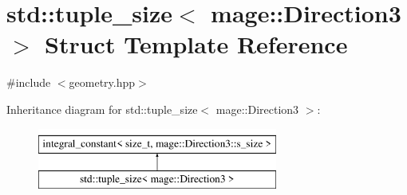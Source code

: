 \hypertarget{structstd_1_1tuple__size_3_01mage_1_1_direction3_01_4}{}\section{std\+:\+:tuple\+\_\+size$<$ mage\+:\+:Direction3 $>$ Struct Template Reference}
\label{structstd_1_1tuple__size_3_01mage_1_1_direction3_01_4}


{\ttfamily \#include $<$geometry.\+hpp$>$}

Inheritance diagram for std\+:\+:tuple\+\_\+size$<$ mage\+:\+:Direction3 $>$\+:\begin{figure}[H]
\begin{center}
\leavevmode
\includegraphics[height=2.000000cm]{structstd_1_1tuple__size_3_01mage_1_1_direction3_01_4}
\end{center}
\end{figure}
